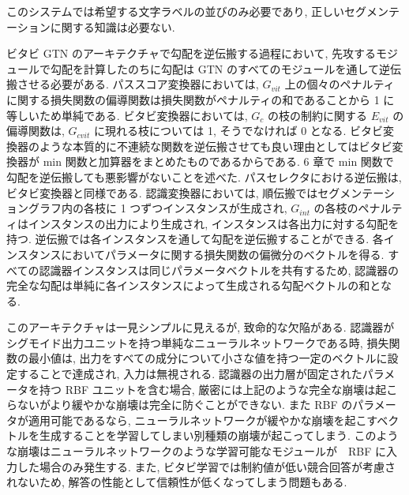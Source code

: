 \documentclass[twocolumn]{jarticle}     %
\begin{document}
このシステムでは希望する文字ラベルの並びのみ必要であり, 正しいセグメンテーションに関する知識は必要ない.
\par
ビタビ GTN のアーキテクチャで勾配を逆伝搬する過程において, 先攻するモジュールで勾配を計算したのちに勾配は GTN のすべてのモジュールを通して逆伝搬させる必要がある.
パススコア変換器においては, $G_{vit}$ 上の個々のペナルティに関する損失関数の偏導関数は損失関数がペナルティの和であることから 1 に等しいため単純である.
ビタビ変換器においては, $G_c$ の枝の制約に関する $E_{vit}$ の偏導関数は, $G_{cvit}$ に現れる枝については 1, そうでなければ 0 となる.
ビタビ変換器のような本質的に不連続な関数を逆伝搬させても良い理由としてはビタビ変換器が min 関数と加算器をまとめたものであるからである. 6 章で min 関数で勾配を逆伝搬しても悪影響がないことを述べた. 
パスセレクタにおける逆伝搬は, ビタビ変換器と同様である.
認識変換器においては, 順伝搬ではセグメンテーショングラフ内の各枝に 1 つずつインスタンスが生成され, $G_{int}$ の各枝のペナルティはインスタンスの出力により生成され, インスタンスは各出力に対する勾配を持つ. 逆伝搬では各インスタンスを通して勾配を逆伝搬することができる. 各インスタンスにおいてパラメータに関する損失関数の偏微分のベクトルを得る. すべての認識器インスタンスは同じパラメータベクトルを共有するため, 認識器の完全な勾配は単純に各インスタンスによって生成される勾配ベクトルの和となる. 
\par
このアーキテクチャは一見シンプルに見えるが, 致命的な欠陥がある. 認識器がシグモイド出力ユニットを持つ単純なニューラルネットワークである時, 損失関数の最小値は, 出力をすべての成分について小さな値を持つ一定のベクトルに設定することで達成され, 入力は無視される.
認識器の出力層が固定されたパラメータを持つ RBF ユニットを含む場合, 厳密には上記のような完全な崩壊は起こらないがより緩やかな崩壊は完全に防ぐことができない. また RBF のパラメータが適用可能であるなら, ニューラルネットワークが緩やかな崩壊を起こすベクトルを生成することを学習してしまい別種類の崩壊が起こってしまう. 
このような崩壊はニューラルネットワークのような学習可能なモジュールが　RBF に入力した場合のみ発生する.
また, ビタビ学習では制約値が低い競合回答が考慮されないため, 解答の性能として信頼性が低くなってしまう問題もある.
\end{document}
